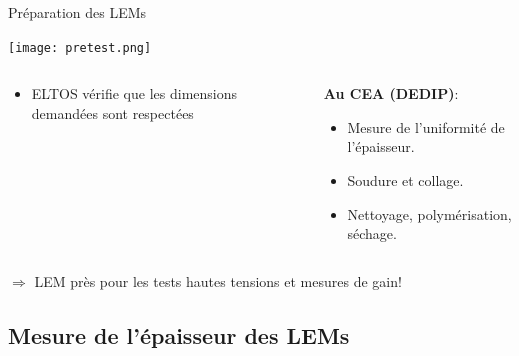     \begin{frame}{Préparation des LEMs}
    	\begin{scriptsize}
    		\begin{center}
		    	\texttt{[image: pretest.png]}
	    	\end{center}
	    	\begin{columns}
	    		\begin{column}{0.5\textwidth}
	    			\begin{itemize}
	    				\item ELTOS vérifie que les dimensions demandées sont respectées
	    			\end{itemize}
	    		\end{column}\hfill
	    		\begin{column}{0.5\textwidth}
	    			\textbf{\hspace{0.3cm}Au CEA (DEDIP)}:
	    			\begin{itemize}
	    				\item Mesure de l'uniformité de l'épaisseur.
	    				\item Soudure et collage.
	    				\item Nettoyage, polymérisation, séchage.
	    			\end{itemize}
	    		\end{column}
	    	\end{columns}
	    \end{scriptsize}
	    \vspace{0.5cm}
        $\Rightarrow$ LEM près pour les tests hautes tensions et mesures de gain!
    \end{frame}

    \subsection[Épaisseur]{Mesure de l'épaisseur des LEMs}

